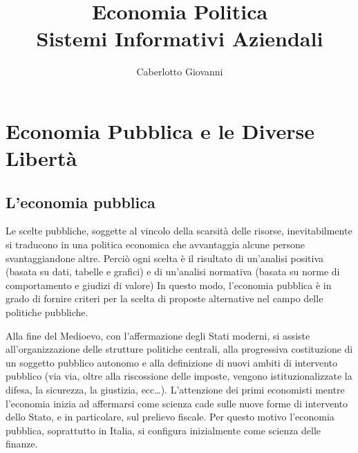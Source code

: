 \documentclass{report}
\title{\Huge{Economia Politica}\\Sistemi Informativi Aziendali}
\author{\huge{Caberlotto Giovanni}}
\date{}
\begin{document}
\maketitle
\newpage%
\tableofcontents
\pagebreak

\chapter{Economia Pubblica e le Diverse Libertà} %

\label{chap:Economia Pubblica e le Diverse Libertà}

\section{L'economia pubblica}


Le scelte pubbliche, soggette al vincolo della scarsità delle risorse, inevitabilmente si traducono in una politica economica che avvantaggia alcune persone svantaggiandone altre. Perciò ogni scelta è il risultato di un'analisi positiva (basata su dati, tabelle e grafici) e di un'analisi normativa (basata su norme di comportamento e giudizi di valore)
In questo modo, l'economia pubblica è in grado di fornire criteri per la scelta di proposte alternative nel campo delle politiche pubbliche.

Alla fine del Medioevo, con l'affermazione degli Stati moderni, si assiste all'organizzazione delle strutture politiche centrali, alla progressiva costituzione di un soggetto pubblico autonomo e alla definizione di nuovi ambiti di intervento pubblico (via via, oltre alla riscossione delle imposte, vengono istituzionalizzate la difesa, la sicurezza, la giustizia, ecc\dots).
L'attenzione dei primi economisti mentre l'economia inizia ad affermarsi come scienza cade sulle nuove forme di intervento dello Stato, e in particolare, sul prelievo fiscale. Per questo motivo l'economia pubblica, soprattutto in Italia, si configura inizialmente come scienza delle finanze.

\end{document}
